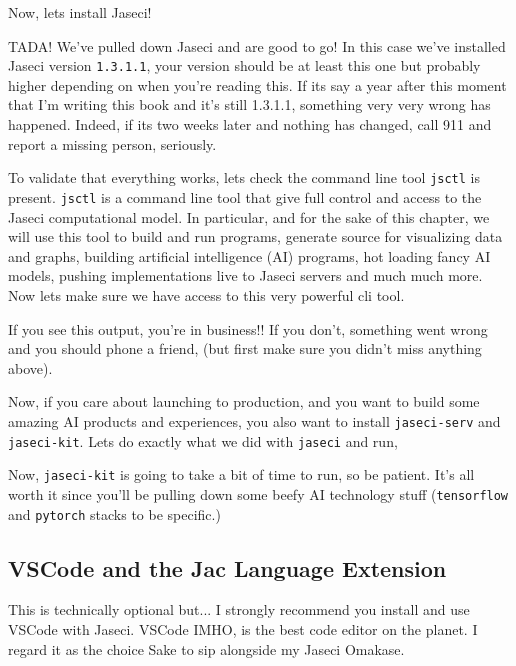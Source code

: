 Now, lets install Jaseci!
\par
{}

TADA! We've pulled down Jaseci and are good to go! In this case we've installed Jaseci version \texttt{1.3.1.1}, your version should be at least this one but probably higher depending on when you're reading this. If its say a year after this moment that I'm writing this book and it's still 1.3.1.1, something very very wrong has happened. Indeed, if its two weeks later and nothing has changed, call 911 and report a missing person, seriously.

To validate that everything works, lets check the command line tool \texttt{jsctl} is present. \texttt{jsctl} is a command line tool that give full control and access to the Jaseci computational model. In particular, and for the sake of this chapter, we will use this tool to build and run programs, generate source for visualizing data and graphs, building artificial intelligence (AI) programs, hot loading fancy AI models, pushing implementations live to Jaseci servers and much much more. Now lets make sure we have access to this very powerful cli tool.

\par
{}

If you see this output, you're in business!! If you don't, something went wrong and you should phone a friend, (but first make sure you didn't miss anything above).
\par
Now, if you care about launching to production, and you want to build some amazing AI products and experiences, you also want to install \texttt{jaseci-serv} and \texttt{jaseci-kit}. Lets do exactly what we did with \texttt{jaseci} and run,
\par
{}
\par
Now, \texttt{jaseci-kit} is going to take a bit of time to run, so be patient. It's all worth it since you'll be pulling down some beefy AI technology stuff (\texttt{tensorflow} and \texttt{pytorch} stacks to be specific.)

\subsection{VSCode and the Jac Language Extension}

This is technically optional but... I strongly recommend you install and use VSCode with Jaseci. VSCode \gls{IMHO}, is the best code editor on the planet. I regard it as the choice Sake to sip alongside my Jaseci Omakase.

